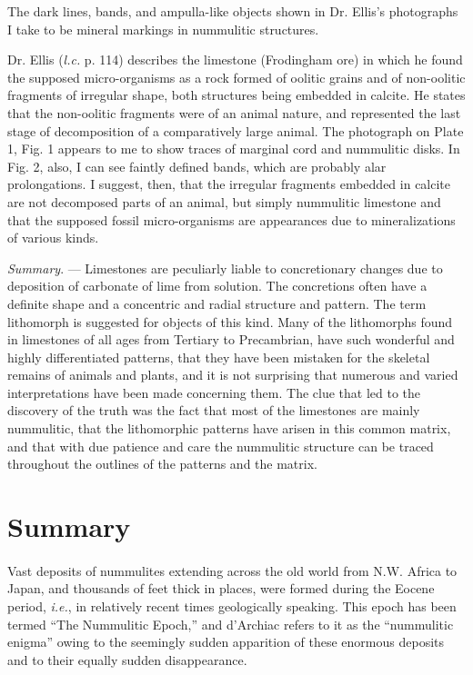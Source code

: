 \documentclass[a4paper, 12pt, oneside]{article}
\begin{document}
The dark lines, bands, and ampulla-like objects shown in Dr. Ellis's photographs I take to be mineral markings in nummulitic structures.

Dr. Ellis (\emph{l.c.} p. 114) describes the limestone (Frodingham ore) in which he found the supposed micro-organisms as a rock formed of oolitic grains and of non-oolitic fragments of irregular shape, both structures being embedded in calcite. He states that the non-oolitic fragments were of an animal nature, and represented the last stage of decomposition of a comparatively large animal. The photograph on Plate 1, Fig. 1 appears to me to show traces of marginal cord and nummulitic disks. In Fig. 2, also, I can see faintly defined bands, which are probably alar prolongations. I suggest, then, that the irregular fragments embedded in calcite are not decomposed parts of an animal, but simply nummulitic limestone and that the supposed fossil micro-organisms are appearances due to mineralizations of various kinds.

\emph{Summary}. --- Limestones are peculiarly liable to concretionary changes due to deposition of carbonate of lime from solution. The concretions often have a definite shape and a concentric and radial structure and pattern. The term lithomorph is suggested for objects of this kind. Many of the lithomorphs found in limestones of all ages from Tertiary to Precambrian, have such wonderful and highly differentiated patterns, that they have been mistaken for the skeletal remains of animals and plants, and it is not surprising that numerous and varied interpretations have been made concerning them. The clue that led to the discovery of the truth was the fact that most of the limestones are mainly nummulitic, that the lithomorphic patterns have arisen in this common matrix, and that with due patience and care the nummulitic structure can be traced throughout the outlines of the patterns and the matrix.
\clearpage
\section{Summary}
\paragraph{}
Vast deposits of nummulites extending across the old world from N.W. Africa to Japan, and thousands of feet thick in places, were formed during the Eocene period, \emph{i.e.}, in relatively recent times geologically speaking. This epoch has been termed ``The Nummulitic Epoch,'' and d'Archiac refers to it as the ``nummulitic enigma'' owing to the seemingly sudden apparition of these enormous deposits and to their equally sudden disappearance.
\end{document}
